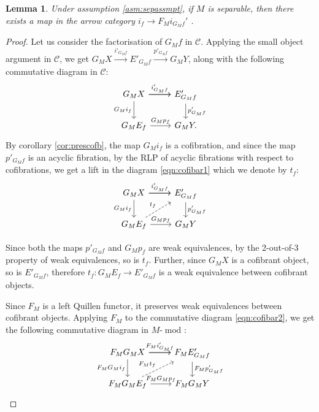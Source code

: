 \documentclass{article}
\newcommand{\cC}{\mathcal{C}}
\newcommand{\module}[2][]{#2\text{-}\modop_{#1}}
\DeclareMathOperator{\modop}{mod}
\newtheorem{lemma}[theorem]{Lemma}
\theoremstyle{definition}
\theoremstyle{remark}
\begin{document}
\begin{lemma} \label{lem:iftoFiGf}
    Under assumption \ref{asm:sepassmpt}, if $M$ is separable, then there exists a map in the arrow 
    category $i_{f} \rightarrow F_{M}i_{G_{M}f}'$ .    
\end{lemma}
\begin{proof}
 Let us consider the factorisation of $G_{M}f$ in $\cC$. Applying the small object argument in $\cC$, we get $G_{M}X \xrightarrow{i'_{G_{M}f}}E'_{G_{M}f} \xrightarrow{p'_{G_{M}f}}G_{M}Y$, along with the following commutative diagram in $\cC$:
\begin{equation} \label{eqn:cofibar1}
    \begin{tikzcd}
       G_{M}X \arrow{r}{i'_{G_{M}f}} \arrow{r} \arrow[swap]{d}{G_{M}i_{f}} & E'_{G_{M}f} \arrow{d}{p'_{G_{M}f}} \\
        G_{M}E_{f} \arrow{r}{G_{M}p_{f}} & G_{M}Y.
     \end{tikzcd}
\end{equation} 
By corollary \ref{cor:prescofb}, the map $G_{M} i_{f}$ is a cofibration, and since the map $p'_{G_{M} f}$ is an acyclic fibration, by the RLP of acyclic fibrations with respect to cofibrations, we get a lift in the diagram \ref{eqn:cofibar1} which we denote by $t_{f}$:  
\begin{equation} \label{eqn:cofibar2}
    \begin{tikzcd}
       G_{M}X \arrow{r}{i'_{G_{M}f}} \arrow{r} \arrow[swap]{d}{G_{M}i_{f}} & E'_{G_{M}f} \arrow{d}{p'_{G_{M}f}} \\
        G_{M}E_{f} \arrow{r}{G_{M}p_{f}} \arrow[ur, dashed,"t_{f}"] & G_{M}Y
     \end{tikzcd}
\end{equation} 
 
Since both the maps $p'_{G_{M}f}$ and $G_{M}p_{f}$ are weak equivalences, by the 2-out-of-3 property of weak equivalences, so is $t_{f}$. Further, since $G_{M}X$ is a cofibrant object, so is $E'_{G_{M}f}$, therefore $t_{f}:G_{M}E_{f} \rightarrow E'_{G_{M}f}$ is a weak equivalence between cofibrant objects.

Since $F_{M}$ is a left Quillen functor, it preserves weak equivalences between cofibrant objects. Applying $F_{M}$ to the commutative diagram \eqref{eqn:cofibar2}, we get the following commutative diagram in $\module{M}$:
\begin{equation} \label{eqn:cofibar3}
    \begin{tikzcd}
       F_{M}G_{M}X \arrow{r}{F_{M}i'_{G_{M}f}} \arrow{r} \arrow[swap]{d}{F_{M}G_{M}i_{f}} & F_{M}E'_{G_{M}f} \arrow{d}{F_{M}p'_{G_{M}f}} \\
        F_{M}G_{M}E_{f} \arrow{r}{F_{M}G_{M}p_{f}} \arrow[ur, dashed,"F_{M}t_{f}"] & F_{M}G_{M}Y
     \end{tikzcd}
\end{equation} 


\end{proof}
\end{document}
